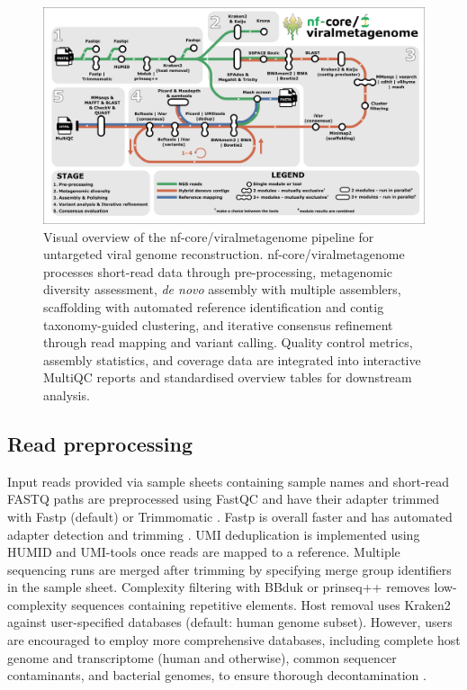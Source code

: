 \begin{figure}[htbp]
    \centering
    \includegraphics[width=1\textwidth]{Fig/fig1.png}
    \caption{Visual overview of the nf-core/viralmetagenome pipeline for untargeted viral genome reconstruction. nf-core/viralmetagenome processes short-read data through pre-processing, metagenomic diversity assessment, \textit{de novo} assembly with multiple assemblers, scaffolding with automated reference identification and contig taxonomy-guided clustering, and iterative consensus refinement through read mapping and variant calling. Quality control metrics, assembly statistics, and coverage data are integrated into interactive MultiQC reports and standardised overview tables for downstream analysis.}
    \label{fig:pipeline-workflow}
\end{figure}


\subsection{Read preprocessing}

Input reads provided via sample sheets containing sample names and short-read FASTQ paths are   preprocessed using FastQC and have their adapter trimmed with Fastp \cite{Chen2018-tu} (default) or Trimmomatic \cite{Bolger2014-si}. Fastp is overall faster and has automated adapter detection and trimming \cite{Chen2018-tu}. UMI deduplication is implemented using HUMID \cite{LarosUnknown-nx} and UMI-tools \cite{Smith2017-nk} once reads are mapped to a reference. Multiple sequencing runs are merged after trimming by specifying merge group identifiers in the sample sheet. Complexity filtering with BBduk \cite{BushnellUnknown-qy} or prinseq++ \cite{Cantu2019-vs} removes low-complexity sequences containing repetitive elements. Host removal uses Kraken2 \cite{Wood2019-jl} against user-specified databases (default: human genome subset). However, users are encouraged to employ more comprehensive databases, including complete host genome and transcriptome (human and otherwise), common sequencer contaminants, and bacterial genomes, to ensure thorough decontamination \cite{Forbes2025-mv}.

